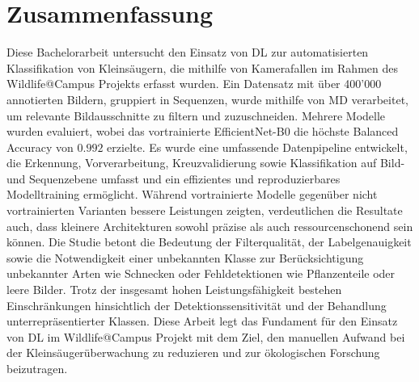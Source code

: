 \section*{Zusammenfassung}
Diese Bachelorarbeit untersucht den Einsatz von \ac{DL} zur automatisierten Klassifikation von Kleinsäugern, die mithilfe von Kamerafallen im Rahmen des Wildlife@Campus Projekts erfasst wurden.
Ein Datensatz mit über 400'000 annotierten Bildern, gruppiert in Sequenzen, wurde mithilfe von \ac{MD} verarbeitet, um relevante Bildausschnitte zu filtern und zuzuschneiden.
Mehrere Modelle wurden evaluiert, wobei das vortrainierte EfficientNet-B0 die höchste Balanced Accuracy von \(0.992\) erzielte.
Es wurde eine umfassende Datenpipeline entwickelt, die Erkennung, Vorverarbeitung, Kreuzvalidierung sowie Klassifikation auf Bild- und Sequenzebene umfasst und ein effizientes und reproduzierbares Modelltraining ermöglicht.
Während vortrainierte Modelle gegenüber nicht vortrainierten Varianten bessere Leistungen zeigten, verdeutlichen die Resultate auch, dass kleinere Architekturen sowohl präzise als auch ressourcenschonend sein können.
Die Studie betont die Bedeutung der Filterqualität, der Labelgenauigkeit sowie die Notwendigkeit einer unbekannten Klasse zur Berücksichtigung unbekannter Arten wie Schnecken oder Fehldetektionen wie Pflanzenteile oder leere Bilder.
Trotz der insgesamt hohen Leistungsfähigkeit bestehen Einschränkungen hinsichtlich der Detektionssensitivität und der Behandlung unterrepräsentierter Klassen.
Diese Arbeit legt das Fundament für den Einsatz von \ac{DL} im Wildlife@Campus Projekt mit dem Ziel, den manuellen Aufwand bei der Kleinsäugerüberwachung zu reduzieren und zur ökologischen Forschung beizutragen.
